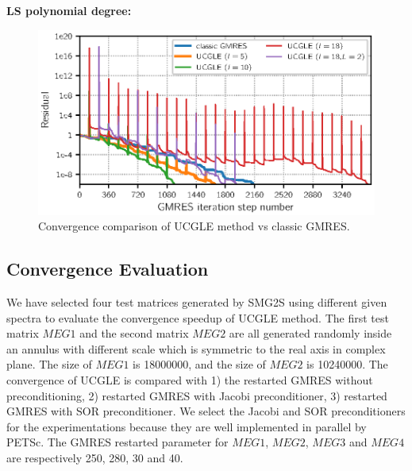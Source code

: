 \textbf{LS polynomial degree: }

\begin{figure}[htbp]
	\centering
	\includegraphics[width=6.2in]{fig/conv2.eps}
	\caption{Convergence comparison of UCGLE method vs classic GMRES.}
	\label{fig:lsdegree}
\end{figure}

\subsection{Convergence Evaluation}

We have selected four test matrices generated by SMG2S using different given spectra to evaluate the convergence speedup of UCGLE method. The first test matrix $MEG1$ and the second matrix $MEG2$ are all generated randomly inside an annulus with different scale which is symmetric to the real axis in complex plane. The size of $MEG1$ is \num[round-precision=2,round-mode=figures]{18000000}, and the size of $MEG2$ is \num[round-precision=4,round-mode=figures]{10240000}. The convergence of UCGLE is compared with 1) the restarted GMRES without preconditioning, 2) restarted GMRES with Jacobi preconditioner, 3) restarted GMRES with SOR preconditioner. We select the Jacobi and SOR preconditioners for the experimentations because they are well implemented in parallel by PETSc. The GMRES restarted parameter for $MEG1$, $MEG2$, $MEG3$ and $MEG4$ are respectively 250, 280, 30 and 40.

